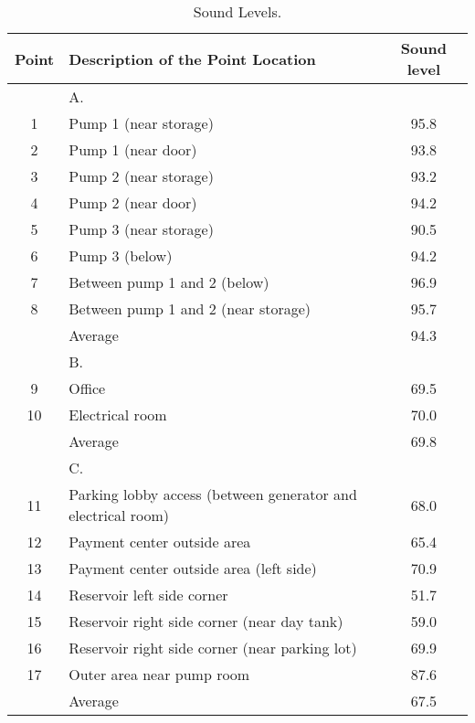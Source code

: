 \begin{table}
	\caption{Sound Levels.}
	\label{ch047_tbl_sound}
	{\footnotesize

\begin{tabular}{c|l|c}
\hline
Point & Description of the Point Location & Sound level \\ 
\hline
 & A. &  \\ 
1 & Pump 1  (near storage) & 95.8 \\ 
2 & Pump 1  (near door) & 93.8 \\ 
3 & Pump 2 (near storage) & 93.2 \\ 
4 & Pump 2  (near door) & 94.2 \\ 
5 & Pump 3  (near storage) & 90.5 \\ 
6 & Pump 3 (below) & 94.2 \\ 
7 & Between pump 1 and 2 (below) & 96.9 \\ 
8 & Between pump 1 and 2 (near storage) & 95.7 \\ 
 & Average & 94.3 \\ 
\hline
 & B. &  \\ 
9 & Office & 69.5 \\ 
10 & Electrical room & 70.0 \\ 
 & Average & 69.8 \\ 
\hline
 & C. &  \\ 
11 & Parking lobby access (between generator and electrical room) & 68.0 \\ 
12 & Payment center outside area & 65.4 \\ 
13 & Payment center outside area (left side) & 70.9 \\ 
14 & Reservoir left side corner & 51.7 \\ 
15 & Reservoir right side corner (near day tank) & 59.0 \\ 
16 & Reservoir right side corner (near parking lot) & 69.9 \\ 
17 & Outer area near pump room & 87.6 \\ 
 & Average & 67.5 \\ 
\hline
\end{tabular}
}
\end{table}